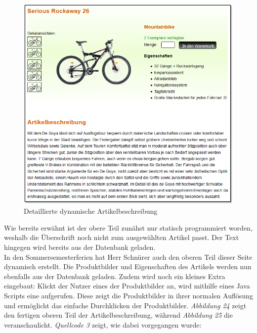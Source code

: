 \begin{figure}[H]
\begin{center}
\includegraphics[width=150mm]{Bilder/Abbildung11-DynamischeDetailierteArtikelbeschreibung.png}
\end{center}
\caption{Detaillierte dynamische Artikelbeschreibung}
\label{Abbildung11-Detaillierte dynamische Artikelbeschreibung}
\end{figure}

Wie bereits erwähnt ist der obere Teil zunähst nur statisch programmiert worden, weshalb die Überschrift noch nicht zum ausgewählten Artikel passt. Der Text \grqq{} hingegen wird bereits aus der Datenbank geladen.
\\
In den Sommersemesterferien hat Herr Schnürer auch den oberen Teil dieser Seite dynamisch erstellt. Die Produktbilder und Eigenschaften des Artikels werden nun ebenfalls aus der Datenbank geladen. Zudem wird noch ein kleines Extra eingebaut: Klickt der Nutzer eines der Produktbilder an, wird mithilfe eines Java Scripts eine \grqq{} aufgerufen. Diese zeigt die Produktbilder in ihrer normalen Auflösung und ermöglicht das einfache Durchklicken der Produktbilder. \textit{Abbildung 24} zeigt den fertigen oberen Teil der Artikelbeschreibung, während \textit{Abbildung 25} die \grqq{} veranschaulicht. \textit{Quellcode 3} zeigt, wie dabei vorgegangen wurde:

